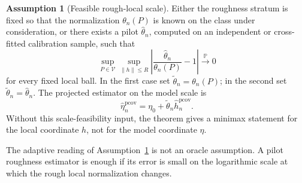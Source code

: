 \documentclass[11pt,a4paper]{amsart}
\theoremstyle{plain}
\theoremstyle{definition}
\newtheorem{assumption}[theorem]{Assumption}
\theoremstyle{remark}
\newcommand{\PP}{\mathbb{P}}
\newcommand{\toP}{\xrightarrow{\PP}}
\begin{document}
\begin{assumption}[Feasible rough-local scale]\label{ass:feasible-local-scale}
Either the roughness stratum is fixed so that the normalization \(\theta_n(P)\) is known on the
class under consideration, or there exists a pilot \(\widehat\theta_n\), computed on an independent
or cross-fitted calibration sample, such that
\[
        \sup_{P\in\mathcal V}
        \sup_{\|h\|\le R}
        \left|
        \frac{\widehat\theta_n}{\theta_n(P)}-1
        \right|
        \toP 0
\]
for every fixed local ball.  In the first case set
\(\widetilde\theta_n=\theta_n(P)\); in the second set
\(\widetilde\theta_n=\widehat\theta_n\).  The projected estimator on the model scale is
\[
        \widehat\eta_n^{\mathrm{pcov}}
        =
        \eta_0+\widetilde\theta_n\widehat h_n^{\mathrm{pcov}}.
\]
Without this scale-feasibility input, the theorem gives a minimax statement for the local
coordinate \(h\), not for the model coordinate \(\eta\).
\end{assumption}

The adaptive reading of Assumption~\ref{ass:feasible-local-scale} is not an oracle assumption.  A
pilot roughness estimator is enough if its error is small on the logarithmic scale at which the
rough local normalization changes.
\end{document}
